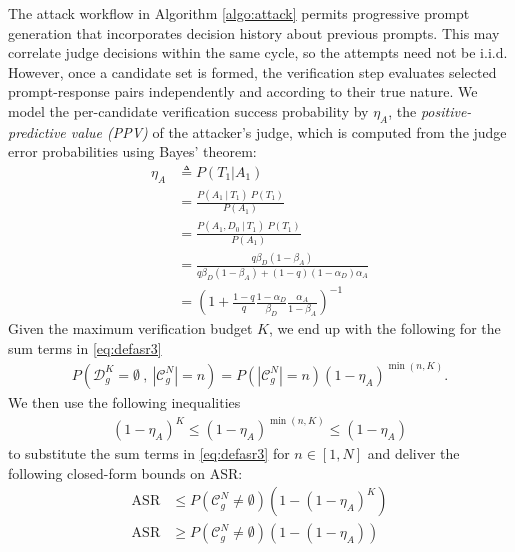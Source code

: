 \documentclass[conference,compsoc]{IEEEtran}
\begin{document}
The attack workflow in Algorithm \ref{algo:attack} permits progressive prompt generation that incorporates decision history about previous prompts. This may correlate judge decisions within the same cycle, so the attempts need not be i.i.d. However, once a candidate set is formed, the verification step evaluates selected prompt-response pairs independently and according to their true nature. We model the per-candidate verification success probability by $\eta_A$, the \textit{positive-predictive value (PPV)} of the attacker's judge, which is computed from the judge error probabilities using Bayes' theorem:
\begin{align}\label{eq:ppv}
    \eta_A&\triangleq P(T_1 | A_1)\\[8pt]\nonumber
    &=\frac{P(A_1~|~T_1)~P(T_1)}{P(A_1)}\\[8pt]\nonumber
    &=\frac{P(A_1, D_0~|~T_1)~P(T_1)}{P(A_1)}\\[8pt]\nonumber
    &=\frac{q\beta_D(1-\beta_A)}{q\beta_D(1-\beta_A) + (1-q)(1-\alpha_D)\alpha_A}\\[8pt]\nonumber
    &=\left(1 + \frac{1-q}{q}\frac{1-\alpha_D}{\beta_D}\frac{\alpha_A}{1-\beta_A}\right)^{-1}
\end{align}
Given the maximum verification budget $K$, we end up with the following for the sum terms in \eqref{eq:defasr3}
\begin{align}
    P(\mathcal{D}_g^K = \emptyset~,~|\mathcal{C}^N_g| = n) = P(|\mathcal{C}^N_g| = n)(1-\eta_A)^{\min(n,K)}.
\end{align}
We then use the following inequalities
\begin{align}
    (1-\eta_A)^K \le (1-\eta_A)^{\min(n,K)} \le (1-\eta_A)
\end{align}
to substitute the sum terms in \eqref{eq:defasr3} for $n \in \left[1,N\right]$ and deliver the following closed-form bounds on ASR:
\begin{align}\label{eq:asrbounds}
    \mathrm{ASR} &\le P(\mathcal{C}^N_g \ne \emptyset)(1 - (1-\eta_A)^K)\nonumber\\
    \mathrm{ASR} &\ge P(\mathcal{C}^N_g \ne \emptyset)(1 - (1-\eta_A))
\end{align}
\end{document}
